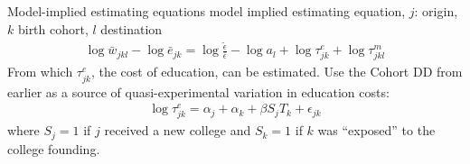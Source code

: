 \documentclass[notes,11pt, aspectratio=169]{beamer}
\begin{document}
\begin{frame}[label=model]{Model-implied estimating equations}
\cite{hsiaoEducationalInvestmentSpatial2024} model implied estimating equation, $j$: origin, $k$ birth cohort, $l$ destination
\begin{align}
  \log \bar w_{jkl} - \log \bar e_{jk} = \log\frac{\tilde \epsilon}{\bar\epsilon} - \log a_l + \log \tau_{jk}^e + \log \tau^m_{jkl}
\end{align}
From which $\tau_{jk}^e$, the cost of education, can be estimated. Use the Cohort DD from earlier as a source of quasi-experimental variation in education costs:
\begin{align}
  \log \tau_{jk}^e = \alpha_j + \alpha_k + \beta S_j T_k +\epsilon_{jk}
\end{align}
where $S_j = 1$ if $j$ received a new college and $S_k=1$ if $k$ was ``exposed'' to the college founding.

\centering
\hyperlink{next_steps}{}
\end{frame}
\end{document}
